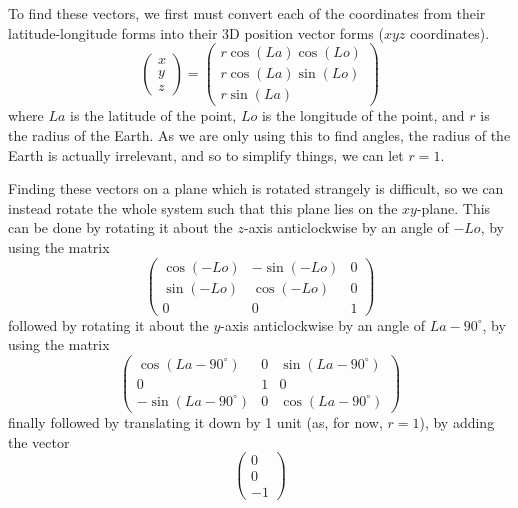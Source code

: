 \documentclass[12pt]{report}
\begin{document}
To find these vectors, we first must convert each of the coordinates from their latitude-longitude forms into their 3D position vector forms ($xyz$ coordinates).
\begin{equation}\label{eq:convert2vectors}
    \begin{pmatrix}x\\y\\z\end{pmatrix}=\begin{pmatrix}r\cos\left(La\right)\cos\left(Lo\right)\\r\cos\left(La\right)\sin\left(Lo\right)\\r\sin\left(La\right)\end{pmatrix}
\end{equation}
where $La$ is the latitude of the point, $Lo$ is the longitude of the point, and $r$ is the radius of the Earth. As we are only using this to find angles, the radius of the Earth is actually irrelevant, and so to simplify things, we can let $r=1$.

Finding these vectors on a plane which is rotated strangely is difficult, so we can instead rotate the whole system such that this plane lies on the $xy$-plane. This can be done by rotating it about the $z$-axis anticlockwise by an angle of $-Lo$, by using the matrix
\begin{equation}\label{eq:transformCoordsStart}
    \begin{pmatrix}\cos\left(-Lo\right)&-\sin\left(-Lo\right)&0\\\sin\left(-Lo\right)&\cos\left(-Lo\right)&0\\0&0&1\end{pmatrix}
\end{equation}
followed by rotating it about the $y$-axis anticlockwise by an angle of $La-90^{\circ}$, by using the matrix
\begin{equation}
    \begin{pmatrix}\cos\left(La-90^{\circ}\right)&0&\sin\left(La-90^{\circ}\right)\\0&1&0\\-\sin\left(La-90^{\circ}\right)&0&\cos\left(La-90^{\circ}\right)\end{pmatrix}
\end{equation}
finally followed by translating it down by 1 unit (as, for now, $r=1$), by adding the vector
\begin{equation}\label{eq:transformCoordsEnd}
    \begin{pmatrix}0\\0\\-1\end{pmatrix}
\end{equation}
\end{document}
